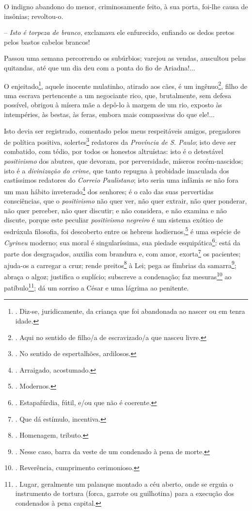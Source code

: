O indigno abandono do menor, criminosamente feito, à sua porta, foi-lhe
causa de insônias; revoltou-o.

-- \emph{Isto é torpeza de branco}, exclamava ele enfurecido, enfiando
os dedos pretos pelos bastos cabelos brancos!

Passou uma semana percorrendo os subúrbios; varejou as vendas, auscultou
pelas quitandas, até que um dia deu com a ponta do fio de Ariadna!...

O enjeitado\footnote{. Diz-se, juridicamente, da criança que foi
  abandonada ao nascer ou em tenra idade.}, aquele inocente mulatinho,
atirado aos cães, é um ingênuo\footnote{. Aqui no sentido de filho/a de
  escravizado/a que nasceu livre.}, filho de uma escrava pertencente a
um negociante rico, que, brutalmente, sem defesa possível, obrigou à
mísera mãe a depô-lo à margem de um rio, exposto às intempéries, às
bestas, às feras, embora mais compassivas do que ele!...

Isto devia ser registrado, comentado pelos meus respeitáveis amigos,
pregadores de política positiva, solertes\footnote{. No sentido de
  espertalhões, ardilosos.} redatores da \emph{Província de S. Paulo};
isto deve ser combatido, com tédio, por todos os honestos altruístas:
isto é o detestável \emph{positivismo} dos abutres, que devoram, por
perversidade, míseros recém-nascidos; isto é a \emph{divinização do
crime}, que tanto repugna à probidade imaculada dos castíssimos
redatores do \emph{Correio Paulistano}; isto seria uma infâmia se não
fora um mau hábito inveterado\footnote{. Arraigado, acostumado.} dos
senhores; é o calo das suas pervertidas consciências, que o
\emph{positivismo} não quer ver, não quer extrair, não quer ponderar,
não quer perceber, não quer discutir; e não considera, e não examina e
não discute, porque este peculiar \emph{positivismo negreiro} é um
sistema exótico de esdrúxula filosofia, foi descoberto entre os hebreus
hodiernos,\footnote{. Modernos.} é uma espécie de \emph{Cyrineu}
moderno; sua moral é singularíssima, sua piedade esquipática\footnote{.
  Estapafúrdia, fútil, e/ou que não é coerente.}: está da parte dos
desgraçados, auxilia com brandura e, com amor, exorta\footnote{. Que dá
  estímulo, incentiva.} os pacientes; ajuda-os a carregar a cruz; rende
preitos\footnote{. Homenagem, tributo.} à Lei; pega as fímbrias da
samarra\footnote{. Nesse caso, barra da veste de um condenado à pena de
  morte.}; abraça o algoz; justifica o suplício; subscreve a condenação;
faz mesuras\footnote{. Reverência, cumprimento cerimonioso.} ao
patíbulo\footnote{. Lugar, geralmente um palanque montado a céu aberto,
  onde se erguia o instrumento de tortura (forca, garrote ou guilhotina)
  para a execução dos condenados à pena capital.};
dá um sorriso a César e uma
lágrima ao penitente.

